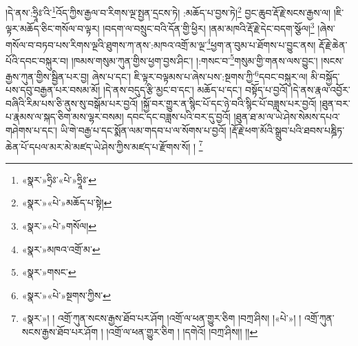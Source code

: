།དེ་ནས་:ཧྲཱིཿ་འི་\footnote{«སྣར་»ཧྲིཿ་«པེ་»ཧྲཱིཿ་}འོད་ཀྱིས་རྒྱལ་བ་རིགས་ལྔ་སྤྱན་དྲངས་ཏེ། :མཆོད་པ་བྱས་ཏེ།\footnote{«སྣར་»«པེ་»མཆོད་པ་སྟེ།} བྱང་ཆུབ་རྡོ་རྗེ་སངས་རྒྱས་ལ། །ཇི་ལྟར་མཆོད་ཅིང་གསོལ་བ་ལྟར། །བདག་ལ་བསྲུང་བའི་དོན་གྱི་ཕྱིར། །ནམ་མཁའི་རྡོ་རྗེ་དེང་བདག་སྩོལ།\footnote{«སྣར་»«པེ་»གསོལ།} །ཞེས་གསོལ་བ་བཏབ་པས་རིགས་ལྔའི་ཐུགས་ཀ་ནས་:མཁའ་འགྲོ་མ་ལྔ་\footnote{«སྣར་»མཁའ་འགྲོ་མ་}ཕྱག་ན་བུམ་པ་ཐོགས་པ་བྱུང་ནས། རྡོ་རྗེ་ཆེན་པོའི་དབང་བསྐུར་བ། །ཁམས་གསུམ་ཀུན་གྱིས་ཕྱག་བྱས་ཤིང་། །:གསང་བ་\footnote{«སྣར་»གསང་}གསུམ་གྱི་གནས་ལས་བྱུང་། །སངས་རྒྱས་ཀུན་གྱིས་སྦྱིན་པར་བྱ། ཞེས་པ་དང་། ཇི་ལྟར་བལྟམས་པ་ཞེས་པས་:སྔགས་ཀྱི་\footnote{«སྣར་»«པེ་»སྔགས་ཀྱིས་}དབང་བསྐུར་ལ། མི་བསྐྱོད་པས་དབུ་བརྒྱན་པར་བསམ་མོ། །དེ་ནས་བདུད་རྩི་མྱང་བ་དང་། མཆོད་པ་དང་། བསྟོད་པ་བྱའོ། །དེ་ནས་རྣལ་འབྱོར་བཞིའི་རིམ་པས་ཅི་ནུས་སུ་བསྒོམ་པར་བྱའོ། །སྐྱོ་བར་གྱུར་ན་སྙིང་པོ་དང་ཉེ་བའི་སྙིང་པོ་བཟླས་པར་བྱའོ། །ཐུན་བར་པ་རྣམས་ལ་སྐད་ཅིག་མས་ལྷར་བསམ། དབང་དང་བཟླས་པའི་བར་དུ་བྱའོ། །ཐུན་ཐ་མ་ལ་ཡེ་ཤེས་སེམས་དཔའ་གཤེགས་པ་དང་། ཡི་གེ་བརྒྱ་པ་དང་སྨོན་ལམ་གདབ་པ་ལ་སོགས་པ་བྱའོ། །རྡོ་རྗེ་ཕག་མོའི་སྒྲུབ་པའི་ཐབས་པཎྜིཏ་ཆེན་པོ་དཔལ་མར་མེ་མཛད་ཡེ་ཤེས་ཀྱིས་མཛད་པ་རྫོགས་སོ། ། \footnote{«སྣར་»། ། འགྲོ་ཀུན་སངས་རྒྱས་ཐོབ་པར་ཤོག །འགྲོ་ལ་ཕན་གྱུར་ཅིག །བཀྲ་ཤིས། །«པེ་»། ། འགྲོ་ཀུན་སངས་རྒྱས་ཐོབ་པར་ཤོག ། །འགྲོ་ལ་ཕན་གྱུར་ཅིག ། །དགེའོ། །བཀྲ་ཤིས།། །།}